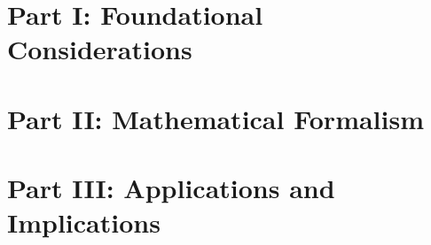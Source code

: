 \documentclass[a4paper,12pt]{article}
\begin{document}
    

    \newpage \section*{Part I: Foundational Considerations}\label{sec:Part-1} 
    \newpage 
    \newpage 

    \newpage \section*{Part II: Mathematical Formalism}\label{sec:Part-2} 
    \newpage 
    \newpage 
    \newpage 
    \newpage 
    \newpage 
    \newpage 
    \newpage 
    \newpage 
    \newpage 
    \newpage 


    \newpage \section*{Part III: Applications and Implications}\label{sec:Part-3} 
    \newpage 
    \newpage 
    \newpage 
    \newpage 
    \newpage 


    \newpage \appendix \label{sec:Part-4} \label{appendix:1}
    \newpage \label{appendix:2}
    \newpage \label{appendix:maxwell_appendix}
    \newpage \label{appendix:TimeDilation}
    \newpage \label{appendix:5}
    \newpage \label{appendix:6}
    \newpage \label{appendix:alpha}
    \newpage \label{appendix:8}
    \newpage \label{appendix:9}
    \newpage \label{appendix:10}
    \newpage \label{appendix:11}

    
    
\end{document}
